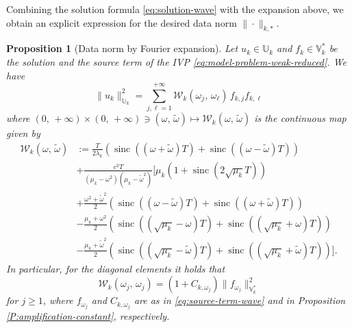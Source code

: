 \documentclass{amsart}
\theoremstyle{plain}
\newtheorem{proposition}[theorem]{Proposition}
\theoremstyle{remark}
\numberwithin{equation}{section}
\numberwithin{theorem}{section}
\newcommand{\trial}{\mathbb{U}}
\newcommand{\data}{\mathbb{V}^*}
\newcommand{\sinc}{\operatorname{sinc}}
\begin{document}
Combining the solution formula \eqref{eq:solution-wave} with the expansion above, we obtain an explicit expression for the desired data norm $\|\cdot\|_{k,*}$.
  
\begin{proposition}[Data norm by Fourier expansion]
	\label{P:data-norm-fourier-expansion}
	Let $u_{k} \in \trial_k$ and $f_k \in \data_k$ be the solution and the source term of the IVP \eqref{eq:model-problem-weak-reduced}. We have
    \begin{equation}
		\label{eq:data-norm-fourier-expansion}
		\|u_k\|^2_{\trial_k} = \sum_{j,\ell=1}^{+\infty} \mathcal{W}_{k}(\omega_j,\,\omega_\ell)\,f_{k,j} f_{k,\ell} 
	\end{equation}
    where $(0,\,+\infty)\times (0,\,+\infty)\ni (\omega,\,\widetilde \omega)\mapsto \mathcal{W}_{k}(\omega,\,\widetilde\omega)$ is the continuous map given by
    \begin{equation}
    \label{eq:data-norm-fourier-expansion-def}
        \begin{aligned}
            \mathcal{W}_{k}(\omega,\,\widetilde\omega) & := \frac{T}{2\lambda_k}\left(\sinc((\omega+\widetilde \omega)T)+\sinc((\omega-\widetilde \omega)T)\right) \\ & + \frac{c^2T}{(\mu_k - \omega^2)(\mu_k-\widetilde\omega^2)} \Bigg[ \mu_k(1+\sinc(2\sqrt{\mu_k}T)) \\ & + \frac{\omega^2+\widetilde\omega^2}{2}(\sinc((\omega-\widetilde\omega)T)+\sinc((\omega+\widetilde\omega)T))
            \\ & - \frac{\mu_k+\omega^2}{2}\left(\sinc((\sqrt{\mu_k} - \omega)T) + \sinc((\sqrt{\mu_k} + \omega)T)\right) \\ & -\frac{\mu_k+\widetilde\omega^2}{2}\left(\sinc((\sqrt{\mu_k} - \widetilde\omega)T)+\sinc((\sqrt{\mu_k} + \widetilde\omega)T)\right)\Bigg].
        \end{aligned}
    \end{equation}
    In particular, for the diagonal elements it holds that
    \begin{equation}
        \label{eq:data-norm-fourier-expansion-def-diag}
        \mathcal{W}_{k}(\omega_j,\,\omega_j) = (1+C_{k,\omega_j})\|f_{\omega_j}\|^2_{\data_k}
    \end{equation}
    for $j \geq 1$, where $f_{\omega_j}$ and $C_{k,\omega_j}$ are as in \eqref{eq:source-term-wave} and in Proposition \ref{P:amplification-constant}, respectively.
\end{proposition}  
  
\end{document}
